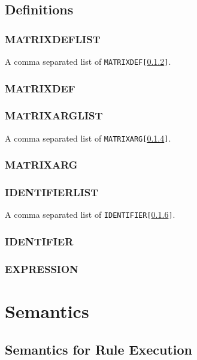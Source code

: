 \documentclass[11pt]{article}
\begin{document}
\subsection{Definitions}
\subsubsection{MATRIXDEFLIST}
\label{MATRIXDEFLIST}
 
A comma separated list of {\tt MATRIXDEF[\ref{MATRIXDEF}]}.

\subsubsection{MATRIXDEF}
\label{MATRIXDEF}

\subsubsection{MATRIXARGLIST}
\label{MATRIXARGLIST}

A comma separated list of {\tt MATRIXARG[\ref{MATRIXARG}]}.

\subsubsection{MATRIXARG}
\label{MATRIXARG}

\subsubsection{IDENTIFIERLIST}
\label{IDENTIFIERLIST}

A comma separated list of {\tt IDENTIFIER[\ref{IDENTIFIER}]}.

\subsubsection{IDENTIFIER}
\label{IDENTIFIER}

\subsubsection{EXPRESSION}
\label{EXPRESSION}

\section{Semantics}

\subsection{Semantics for Rule Execution}
\end{document}
